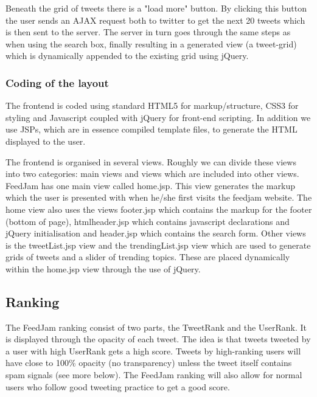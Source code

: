 Beneath the grid of tweets there is a "load more" button. By clicking this button the user sends an AJAX request both to twitter to get the next 20 tweets which is then sent to the server. The server in turn goes through the same steps as when using the search box, finally resulting in a generated view (a tweet-grid) which is dynamically appended to the existing grid using jQuery.

\subsubsection{Coding of the layout}
The frontend is coded using standard HTML5 for markup/structure, CSS3 for styling and Javascript coupled with jQuery for front-end scripting. In addition we use JSPs, which are in essence compiled template files, to generate the HTML displayed to the user.

The frontend is organised in several views. Roughly we can divide these views into two categories: main views and views which are included into other views. FeedJam has one main view called home.jsp. This view generates the markup which the user is presented with when he/she first visits the feedjam website. The home view also uses the views footer.jsp which contains the markup for the footer (bottom of page), htmlheader.jsp which contains javascript declarations and jQuery initialisation and header.jsp which contains the search form. Other views is the tweetList.jsp view and the trendingList.jsp view which are used to generate grids of tweets and a slider of trending topics. These are placed dynamically within the home.jsp view through the use of jQuery.


\subsection{Ranking} %
\label{ranking}
The FeedJam ranking consist of two parts, the TweetRank and the UserRank. It is displayed through the opacity of each tweet. The idea is that tweets tweeted by a user with high UserRank gets a high score. Tweets by high-ranking users will have close to 100\% opacity (no transparency) unless the tweet itself contains spam signals (see more below). The FeedJam ranking will also allow for normal users who follow good tweeting practice to get a good score.

